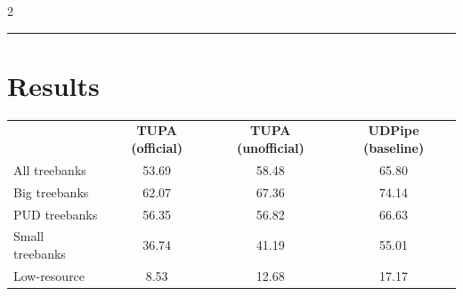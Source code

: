 \documentclass[a0,portrait]{a0poster}
\begin{document}
\begin{multicols}{2}
\hrule



\section*{Results}


\begin{tabular}{lccc}
\hline
& \multirow{2}{12mm}{\bf TUPA {\small(official)}} & \multirow{2}{15mm}{\bf TUPA {\small(unofficial)}}
& \multirow{2}{14mm}{\bf UDPipe {\small(baseline)}} \\\\
\hline
All treebanks & 53.69 & 58.48 & 65.80 \\
Big treebanks & 62.07 & 67.36 & 74.14 \\
PUD treebanks & 56.35 & 56.82 & 66.63 \\
Small treebanks & 36.74 & 41.19 & 55.01 \\
Low-resource & 8.53 & 12.68 & 17.17
\end{tabular}




\end{multicols}
\end{document}
